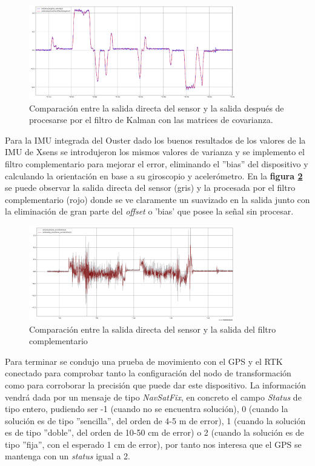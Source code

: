\begin{figure}[H]
    \centering
    \includegraphics[width=0.8\textwidth]{images/comparacion_mti_covarianza.png}
    \caption{Comparación entre la salida directa del sensor y la salida después de procesarse por el filtro de Kalman con las matrices de covarianza.}
    \label{fig:comparacion_covarianza}
\end{figure}

Para la IMU integrada del Ouster dado los buenos resultados de los valores de la IMU de Xsens se introdujeron los mismos valores de varianza y se implemento el filtro complementario 
para mejorar el error, eliminando el ''bias'' del dispositivo y calculando la orientación en base a su giroscopio y acelerómetro. En la 
\textbf{figura \ref{fig:complementariovsouster}} se puede observar la salida directa del sensor (gris) y la procesada por el filtro complementario (rojo) donde 
se ve claramente un suavizado en la salida junto con la eliminación de gran parte del \textit{offset} o 'bias' que posee la señal sin procesar.

\begin{figure}[H]
    \centering
    \includegraphics[width=0.8\textwidth]{images/ousterIMu_vscomplementary.png}
    \caption{Comparación entre la salida directa del sensor y la salida del filtro complementario}
    \label{fig:complementariovsouster}
\end{figure}

Para terminar se condujo una prueba de movimiento con el GPS y el RTK conectado para comprobar tanto la configuración del nodo de transformación como 
para corroborar la precisión que puede dar este dispositivo. La información vendrá dada por un mensaje de tipo \textit{NavSatFix}, en concreto el campo  
\textit{Status} de tipo entero, pudiendo ser -1 (cuando no se encuentra solución), 0 (cuando la solución es de tipo ''sencilla'', del orden de 4-5 m 
de error), 1 (cuando la solución es de tipo ''doble'', del orden de 10-50 cm de error) o 2 (cuando la solución es de tipo ''fija'', con el esperado 1 
cm de error), por tanto nos interesa que el GPS se mantenga con un \textit{status} igual a 2.

